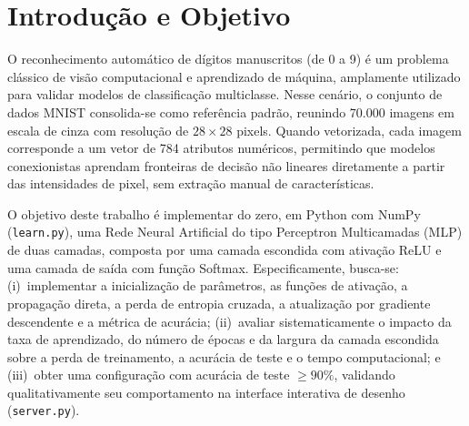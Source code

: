 \section{Introdução e Objetivo}

O reconhecimento automático de dígitos manuscritos (de 0 a 9) é um problema clássico de visão computacional e aprendizado de máquina, amplamente utilizado para validar modelos de classificação multiclasse. Nesse cenário, o conjunto de dados MNIST consolida-se como referência padrão, reunindo 70.000 imagens em escala de cinza com resolução de $28 \times 28$ pixels. Quando vetorizada, cada imagem corresponde a um vetor de 784 atributos numéricos, permitindo que modelos conexionistas aprendam fronteiras de decisão não lineares diretamente a partir das intensidades de pixel, sem extração manual de características.

O objetivo deste trabalho é implementar do zero, em Python com NumPy (\texttt{learn.py}), uma Rede Neural Artificial do tipo Perceptron Multicamadas (MLP) de duas camadas, composta por uma camada escondida com ativação ReLU e uma camada de saída com função Softmax. Especificamente, busca-se: (i)~implementar a inicialização de parâmetros, as funções de ativação, a propagação direta, a perda de entropia cruzada, a atualização por gradiente descendente e a métrica de acurácia; (ii)~avaliar sistematicamente o impacto da taxa de aprendizado, do número de épocas e da largura da camada escondida sobre a perda de treinamento, a acurácia de teste e o tempo computacional; e (iii)~obter uma configuração com acurácia de teste $\ge 90\%$, validando qualitativamente seu comportamento na interface interativa de desenho (\texttt{server.py}).
